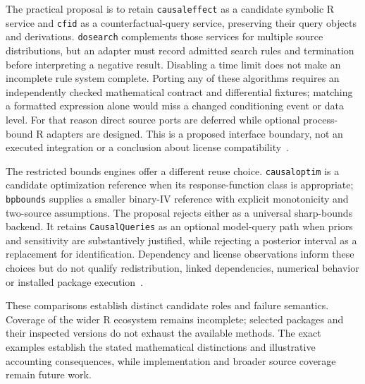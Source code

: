 The practical proposal is to retain \texttt{causaleffect} as a candidate symbolic R service and \texttt{cfid} as a counterfactual-query service, preserving their query objects and derivations. \texttt{dosearch} complements those services for multiple source distributions, but an adapter must record admitted search rules and termination before interpreting a negative result. Disabling a time limit does not make an incomplete rule system complete. Porting any of these algorithms requires an independently checked mathematical contract and differential fixtures; matching a formatted expression alone would miss a changed conditioning event or data level. For that reason direct source ports are deferred while optional process-bound R adapters are designed. This is a proposed interface boundary, not an executed integration or a conclusion about license compatibility~\citep{exec18_rid_causaleffect,exec18_rid_cfid,exec18_rid_dosearch}.

The restricted bounds engines offer a different reuse choice. \texttt{causaloptim} is a candidate optimization reference when its response-function class is appropriate; \texttt{bpbounds} supplies a smaller binary-IV reference with explicit monotonicity and two-source assumptions. The proposal rejects either as a universal sharp-bounds backend. It retains \texttt{CausalQueries} as an optional model-query path when priors and sensitivity are substantively justified, while rejecting a posterior interval as a replacement for identification. Dependency and license observations inform these choices but do not qualify redistribution, linked dependencies, numerical behavior or installed package execution~\citep{exec18_rid_causaloptim,exec18_rid_bpbounds,exec18_rid_causalqueries}.

These comparisons establish distinct candidate roles and failure semantics. Coverage of the wider R ecosystem remains incomplete; selected packages and their inspected versions do not exhaust the available methods. The exact examples establish the stated mathematical distinctions and illustrative accounting consequences, while implementation and broader source coverage remain future work.

